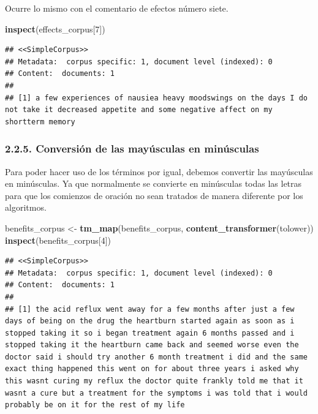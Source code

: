\documentclass[spanish,]{article}
\newenvironment{Shaded}{\begin{snugshade}}{\end{snugshade}}
\newcommand{\KeywordTok}[1]{\textcolor[rgb]{0.13,0.29,0.53}{\textbf{#1}}}
\newcommand{\DecValTok}[1]{\textcolor[rgb]{0.00,0.00,0.81}{#1}}
\newcommand{\StringTok}[1]{\textcolor[rgb]{0.31,0.60,0.02}{#1}}
\newcommand{\NormalTok}[1]{#1}
\begin{document}
Ocurre lo mismo con el comentario de efectos número siete.

\begin{Shaded}
\begin{Highlighting}[]
\KeywordTok{inspect}\NormalTok{(effects_corpus[}\DecValTok{7}\NormalTok{])}
\end{Highlighting}
\end{Shaded}

\begin{verbatim}
## <<SimpleCorpus>>
## Metadata:  corpus specific: 1, document level (indexed): 0
## Content:  documents: 1
## 
## [1] a few experiences of nausiea heavy moodswings on the days I do not take it decreased appetite and some negative affect on my shortterm memory
\end{verbatim}

\subsubsection{2.2.5. Conversión de las mayúsculas en
minúsculas}\label{conversion-de-las-mayusculas-en-minusculas}

Para poder hacer uso de los términos por igual, debemos convertir las
mayúsculas en minúsculas. Ya que normalmente se convierte en minúsculas
todas las letras para que los comienzos de oración no sean tratados de
manera diferente por los algoritmos.

\begin{Shaded}
\begin{Highlighting}[]
\NormalTok{benefits_corpus <-}\StringTok{ }\KeywordTok{tm_map}\NormalTok{(benefits_corpus, }\KeywordTok{content_transformer}\NormalTok{(tolower))}
\KeywordTok{inspect}\NormalTok{(benefits_corpus[}\DecValTok{4}\NormalTok{])}
\end{Highlighting}
\end{Shaded}

\begin{verbatim}
## <<SimpleCorpus>>
## Metadata:  corpus specific: 1, document level (indexed): 0
## Content:  documents: 1
## 
## [1] the acid reflux went away for a few months after just a few days of being on the drug the heartburn started again as soon as i stopped taking it so i began treatment again 6 months passed and i stopped taking it the heartburn came back and seemed worse even the doctor said i should try another 6 month treatment i did and the same exact thing happened this went on for about three years i asked why this wasnt curing my reflux the doctor quite frankly told me that it wasnt a cure but a treatment for the symptoms i was told that i would probably be on it for the rest of my life
\end{verbatim}
\end{document}
